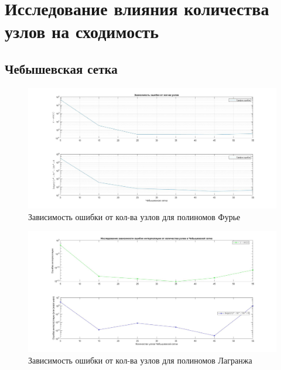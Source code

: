 \documentclass[a4paper]{article}
\begin{document}
\newpage

\section{Исследование влияния количества узлов на сходимость} 
\subsection{Чебышевская сетка}
\begin{figure}[h!]
\begin{center}
\includegraphics[scale=0.3]{зависимость ошибки от кол-ва узлов.jpg} 
\end{center}
\caption{Зависимость ошибки от кол-ва узлов для полиномов Фурье} \label{Рис4}
\end{figure}
 \begin{figure}[h!]
\begin{center}
\includegraphics[scale=0.3]{кол-во узлов Чебышев.jpg} 
\end{center}
\caption{Зависимость ошибки от кол-ва узлов для полиномов Лагранжа} \label{Рис5}
\end{figure}
\end{document}
